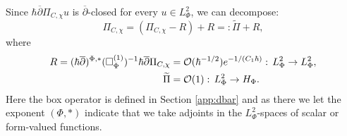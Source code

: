 \documentclass{article}
\newcommand{\h}{\hbar}
\begin{document}
\par Since $\h\overline{\partial }\Pi _{C,\chi }u$ is
$\overline{\partial }$-closed for every $u\in L^2_\Phi $, we can
decompose:
\begin{equation}\label{bcn.5}
  \Pi _{C,\chi }=(\Pi _{C,\chi }-R)+R=:\widetilde{\Pi }+R,
\end{equation}
where
\begin{equation}\label{bcn.6}\begin{split}
    R=(\h\overline{\partial })^{\Phi ,*} (\Box^{(1)}_\Phi
    )^{-1}\h\overline{\partial }\Pi _{C,\chi }&={\cal
      O}(\h^{-1/2})e^{-1/(C_1\h)}:\, L^2_\Phi \to
    L^2_\Phi ,\\
    \widetilde{\Pi }&={\cal O}(1):\, L^2_\Phi \to H_\Phi .
  \end{split}
\end{equation}
Here the box operator is defined in Section \ref{app:dbar} and as
there we let the exponent $(\Phi ,*)$ indicate that we take adjoints
in the $L_\Phi ^2$-spaces of scalar or form-valued functions.
\end{document}
